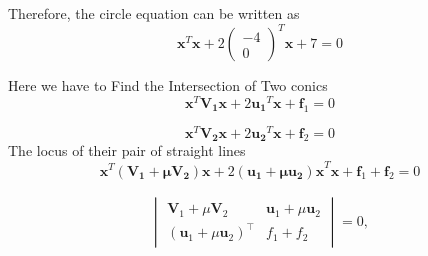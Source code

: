 \documentclass[journal,12pt,twocolumn]{article}
\let\vec\mathbf
\newcommand{\myvec}[1]{\ensuremath{\begin{pmatrix}#1\end{pmatrix}}}
\newcommand{\mydet}[1]{\ensuremath{\begin{vmatrix}#1\end{vmatrix}}}
\providecommand{\brak}[1]{\ensuremath{\left(#1\right)}}
\begin{document}
\endcenter
\begin{flushleft}
\vspace{0.23cm}
Therefore, the circle equation can be written as
\begin{equation}
    \vec{x}^T \vec{x} + 2 \myvec{-4\\0}^T \vec{x} +7= 0
\end{equation}

  Here we have to Find the Intersection of Two conics
\begin{equation}
 \vec{x}^T \vec{V_1} \vec{x} + 2 \vec{u_1}^T \vec{x} + \vec f_1 = 0
\end{equation}




\begin{equation} 
\vec{x}^T \vec{V_2} \vec{x} + 2 \vec{u_2}^T \vec{x} + \vec f_2 = 0
\end{equation}
The locus of their pair of straight lines\\

\begin{equation}                       
	\vec{x}^T \vec{(V_1+\mu V_2)x}+2\vec{(u_1+\mu u_2)x}^T \vec x + \vec f_1+ \vec f_2  = 0              
\end{equation}

  \begin{align}
\mydet{
\vec{V}_1+ \mu \vec{V}_2&\vec{u}_1+\mu\vec{u}_2
\\
	\brak{\vec{u}_1+\mu\vec{u}_2}^{\top}&f_1 +f_2
}
	= 0, 
\end{align}

 


\end{flushleft}
\end{document}
